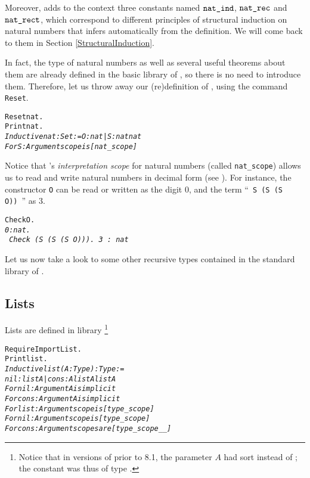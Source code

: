 \documentclass[11pt]{article}
\begin{document}
Moreover, {\coq} adds to the context three constants named
 $\texttt{nat\_ind}$, $\texttt{nat\_rec}$ and $\texttt{nat\_rect}$, which
 correspond to different principles of structural induction on
natural numbers that {\coq} infers automatically from the definition.  We
will come back to them in Section \ref{StructuralInduction}.


In fact, the type of natural numbers as well as several useful
theorems about them are already defined in the basic library of {\coq},
so there is no need to introduce them.  Therefore, let us throw away
our (re)definition of {\nat}, using the command \texttt{Reset}.

\begin{alltt}
Reset nat.
Print nat.
\it{}Inductive nat : Set :=  O : nat | S : nat \arrow{} nat
For S: Argument scope is [nat_scope]
\end{alltt}

Notice that \coq{}'s \emph{interpretation scope} for natural numbers
(called \texttt{nat\_scope})
allows us to read and write natural numbers in decimal form (see \cite{coqrefman}). For instance, the constructor \texttt{O} can be read or written
as the digit $0$, and the term ``~\texttt{S (S (S O))}~'' as $3$.

\begin{alltt}
Check O.
\it 0 : nat.
\tt
Check (S (S (S O))).
\it 3 : nat
\end{alltt}

Let us now take a look to some other
recursive types contained in the standard library of {\coq}.

\subsection{Lists}
Lists are defined in library \footnote{Notice that in versions of
{\coq}
prior to 8.1, the parameter $A$ had sort  instead of ;
the constant  was thus of type .}


\begin{alltt}
Require Import List.
Print list.
\it
Inductive list (A : Type) : Type:=
    nil : list A | cons : A {\arrow} list A {\arrow} list A
For nil: Argument A is implicit
For cons: Argument A is implicit
For list: Argument scope is [type_scope]
For nil: Argument scope is [type_scope]
For cons: Argument scopes are [type_scope _ _]
\end{alltt}
\end{document}
